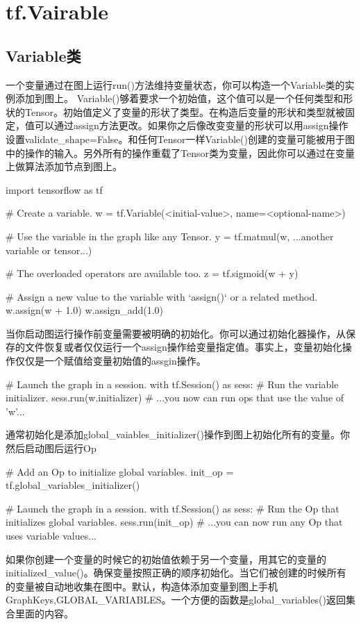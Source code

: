 \section{tf.Vairable}
\subsection{Variable类}
一个变量通过在图上运行run()方法维持变量状态，你可以构造一个Variable类的实例添加到图上。
Variable()够着要求一个初始值，这个值可以是一个任何类型和形状的Tensor。初始值定义了变量的形状了类型。在构造后变量的形状和类型就被固定，值可以通过assign方法更改。如果你之后像改变变量的形状可以用assign操作设置validate\_shape=False。和任何Tensor一样Variable()创建的变量可能被用于图中的操作的输入。另外所有的操作重载了Tensor类为变量，因此你可以通过在变量上做算法添加节点到图上。
\begin{python}
import tensorflow as tf

# Create a variable.
w = tf.Variable(<initial-value>, name=<optional-name>)

# Use the variable in the graph like any Tensor.
y = tf.matmul(w, ...another variable or tensor...)

# The overloaded operators are available too.
z = tf.sigmoid(w + y)

# Assign a new value to the variable with `assign()` or a related method.
w.assign(w + 1.0)
w.assign_add(1.0)
\end{python}
当你启动图运行操作前变量需要被明确的初始化。你可以通过初始化器操作，从保存的文件恢复或者仅仅运行一个assign操作给变量指定值。事实上，变量初始化操作仅仅是一个赋值给变量初始值的assgin操作。
\begin{python}
# Launch the graph in a session.
with tf.Session() as sess:
    # Run the variable initializer.
    sess.run(w.initializer)
    # ...you now can run ops that use the value of 'w'...
\end{python}
通常初始化是添加global\_vaiables\_initializer()操作到图上初始化所有的变量。你然后启动图后运行Op
\begin{python}
# Add an Op to initialize global variables.
init_op = tf.global_variables_initializer()

# Launch the graph in a session.
with tf.Session() as sess:
    # Run the Op that initializes global variables.
    sess.run(init_op)
    # ...you can now run any Op that uses variable values...
\end{python}
如果你创建一个变量的时候它的初始值依赖于另一个变量，用其它的变量的initialized\_value()。确保变量按照正确的顺序初始化。当它们被创建的时候所有的变量被自动地收集在图中。默认，构造体添加变量到图上手机GraphKeys,GLOBAL\_VARIABLES。一个方便的函数是global\_variables()返回集合里面的内容。

